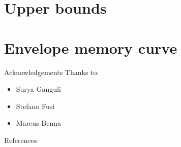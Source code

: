 \documentclass{beamer}%
\begin{document}

\section{Upper bounds}




\section{Envelope memory curve}







%
%
%

\begin{frame}{Acknowledgements}
%
 Thanks to:
 \begin{itemize}
   \item Surya Ganguli
   \item Stefano Fusi
   \item Marcus Benna
 \end{itemize}
%
\end{frame}


\begin{frame}[allowframebreaks]{References}
%

 {\small
 
 
 }
%
\end{frame}


\end{document}
